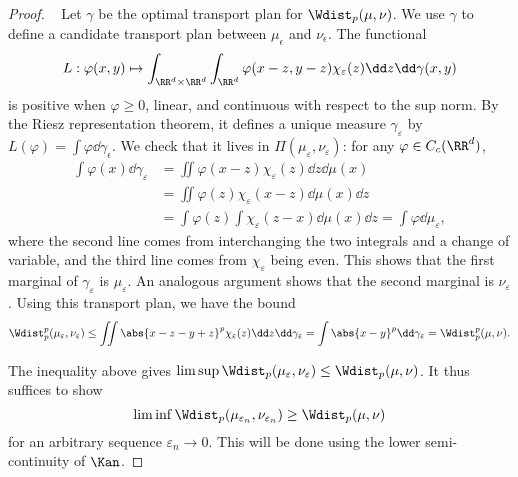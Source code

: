 \documentclass[oneside,reqno,letterpaper]{amsart}
\begin{document}
\begin{proof}~
  Let \(\gamma\) be the optimal transport plan for \(\Wdist_p(\mu, \nu)\).
  We use \(\gamma\) to define a candidate transport plan between \(\mu_{\epsilon}\) and \(\nu_{\epsilon}\).
  The functional
  \[
    L
    : \varphi(x, y)
    \mapsto
    \int_{\RR^d \times \RR^d} \int_{\RR^d} \varphi(x - z, y - z) \chi_{\varepsilon}(z) \dd z \dd \gamma(x, y)
  \]
  is positive when \(\varphi \geq 0\), linear, and continuous with respect to the sup norm.
  By the Riesz representation theorem, it defines a unique measure \(\gamma_{\varepsilon}\) by \(L(\varphi) = \int \varphi \dd \gamma_{\epsilon}\).
  We check that it lives in \(\Pi(\mu_{\varepsilon}, \nu_{\varepsilon})\):
  for any \(\varphi \in C_c(\RR^d)\),
  \begin{align*}
    \int \varphi(x) \dd \gamma_{\varepsilon}
    &= \iint \varphi(x - z) \chi_{\varepsilon}(z) \dd z \dd \mu(x) \\
    &= \iint \varphi(z) \chi_{\varepsilon}(x - z) \dd \mu(x) \dd z \\
    &= \int \varphi(z) \int \chi_{\varepsilon}(z - x) \dd \mu(x) \dd z
    = \int \varphi \dd \mu_{\varepsilon},
  \end{align*}
  where the second line comes from interchanging the two integrals and a change of variable, and the third line comes from \(\chi_{\varepsilon}\) being even.
  This shows that the first marginal of \(\gamma_{\varepsilon}\) is \(\mu_{\varepsilon}\).
  An analogous argument shows that the second marginal is \(\nu_{\varepsilon}\).
  Using this transport plan, we have the bound
  \[
    \Wdist_p^p(\mu_{\varepsilon}, \nu_{\varepsilon})
    \leq \iint \abs{x - z - y + z}^p \chi_{\varepsilon}(z) \dd z \dd \gamma_{\varepsilon}
    = \int \abs{x - y}^p \dd \gamma_{\varepsilon}
    = \Wdist_p^p(\mu, \nu).
  \]

  The inequality above gives \(\limsup \Wdist_p(\mu_{\varepsilon}, \nu_{\varepsilon}) \leq \Wdist_p(\mu, \nu)\).
  It thus suffices to show
  \[
    \liminf \Wdist_p(\mu_{\varepsilon_n}, \nu_{\varepsilon_n}) \geq \Wdist_p(\mu, \nu)
  \]
  for an arbitrary sequence \(\varepsilon_n \to 0\).
  This will be done using the lower semi-continuity of \(\Kan\).


\end{proof}
\end{document}

